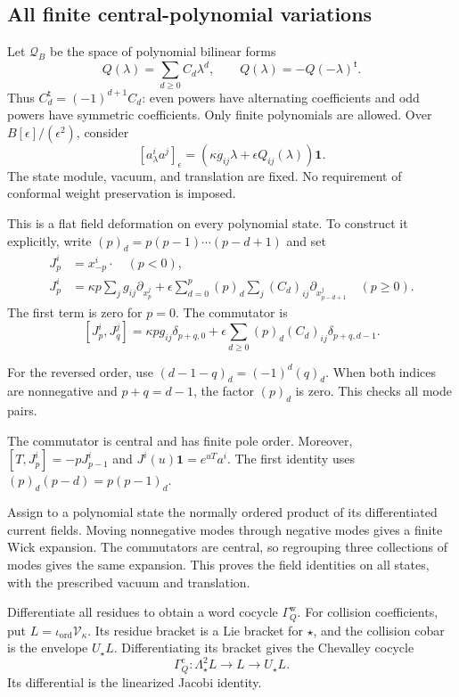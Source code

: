 \subsection{All finite central-polynomial variations}
\label{v4-arith:centers:subsec:central-polynomials}

Let $\mathcal Q_B$ be the
space of polynomial
bilinear forms
\[
 Q(\lambda)=\sum_{d\geq0}C_d\lambda^d,\qquad
 Q(\lambda)=-Q(-\lambda)^{\mathsf t}.
\]
Thus $C_d^{\mathsf t}=(-1)^{d+1}C_d$:
even powers have alternating
coefficients and odd powers
have symmetric coefficients.
Only finite polynomials
are allowed.
Over $B[\epsilon]/(\epsilon^2)$,
consider
\[
 [a^i_\lambda a^j]_\epsilon
 =(\kappa g_{ij}\lambda+
       \epsilon Q_{ij}(\lambda))\mathbf1.
\]
The state module, vacuum,
and translation are fixed.
No requirement of conformal
weight preservation is
imposed.

This is a flat field
deformation on every
polynomial state. To
construct it explicitly,
write $(p)_d=p(p-1)\cdots(p-d+1)$
and set
\[
\begin{split}
 J^i_p&=x^i_{-p}\cdot\quad(p<0),\\
 J^i_p&=
 \kappa p\sum_jg_{ij}\partial_{x^j_p}
 +\epsilon\sum_{d=0}^p(p)_d
       \sum_j(C_d)_{ij}\partial_{x^j_{p-d+1}}
       \quad(p\geq0).
\end{split}
\]
The first term is zero
for $p=0$.
The commutator is
\begin{equation}\label{v4-arith:centers:eq:central-modes}
 [J^i_p,J^j_q]
 =
 \kappa p g_{ij}\delta_{p+q,0}
 +\epsilon\sum_{d\geq0}(p)_d(C_d)_{ij}
                      \delta_{p+q,d-1}.
\end{equation}

For the reversed order,
use
$(d-1-q)_d=(-1)^d(q)_d$.
When both indices are
nonnegative and $p+q=d-1$,
the factor $(p)_d$ is
zero. This checks all
mode pairs.

The commutator is central
and has finite pole order.
Moreover,
$[T,J^i_p]=-pJ^i_{p-1}$ and
$J^i(u)\mathbf1=e^{uT}a^i$.
The first identity uses
$(p)_d(p-d)=p(p-1)_d$.

Assign to a polynomial
state the normally ordered
product of its differentiated
current fields. Moving
nonnegative modes through
negative modes gives a
finite Wick expansion.
The commutators are central,
so regrouping three
collections of modes gives
the same expansion.
This proves the field
identities on all states,
with the prescribed vacuum
and translation.

Differentiate all residues
to obtain a word cocycle
$\Gamma_Q^{\mathrm w}$.
For collision coefficients,
put $L=\iota_{\mathrm{ord}}\mathscr V_\kappa$.
Its residue bracket is a
Lie bracket for $\star$,
and the collision cobar is
the envelope $U_\star L$.
Differentiating its bracket
gives the Chevalley cocycle
\[
 \Gamma_Q^{\mathrm c}:
 \Lambda^2_\star L\longrightarrow L
       \longrightarrow U_\star L.
\]
Its differential is the
linearized Jacobi identity.

